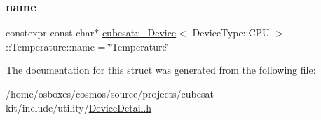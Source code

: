 \subsubsection{\texorpdfstring{name}{name}}
{\footnotesize\ttfamily constexpr const char$\ast$ \hyperlink{structcubesat_1_1__Device}{cubesat\+::\+\_\+\+Device}$<$ Device\+Type\+::\+C\+PU $>$\+::Temperature\+::name = \char`\"{}Temperature\char`\"{}\hspace{0.3cm}{\ttfamily [static]}}



The documentation for this struct was generated from the following file\+:\begin{DoxyCompactItemize}
\item 
/home/osboxes/cosmos/source/projects/cubesat-\/kit/include/utility/\hyperlink{DeviceDetail_8h}{Device\+Detail.\+h}\end{DoxyCompactItemize}
